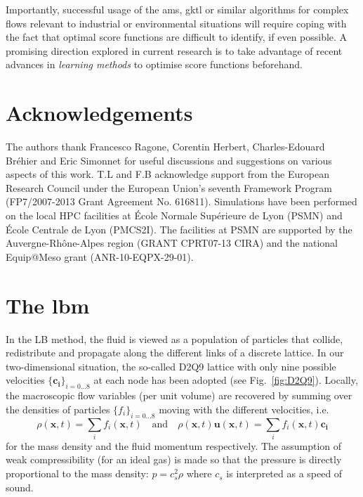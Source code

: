 \documentclass[pre,aps,floatfix,10pt,superscriptaddress, notitlepage,preprint]{revtex4-1}
\begin{document}
Importantly, successful usage of the \ac{ams}, \ac{gktl} or similar algorithms for complex flows relevant to industrial or environmental situations will require coping with the fact that optimal score functions
are difficult to identify, if even possible.
A promising direction explored in current research is to take advantage of recent advances in \emph{learning methods} to optimise score functions beforehand.

\section{Acknowledgements}
The authors thank Francesco Ragone, Corentin Herbert, Charles-Edouard Bréhier and Eric Simonnet for useful discussions and suggestions on various aspects of this work.
T.L and F.B acknowledge support from the European Research Council under the European Union's seventh Framework Program (FP7/2007-2013 Grant Agreement No. 616811).
Simulations have been performed on the local HPC facilities at École Normale Supérieure de Lyon (PSMN) and École Centrale de Lyon (PMCS2I).
The facilities at PSMN are supported by the Auvergne-Rhône-Alpes region (GRANT CPRT07-13 CIRA) and the national Equip@Meso grant (ANR-10-EQPX-29-01).

\appendix*
\section{The \acl{lbm}}
\label{sec:lbm}

In the LB method, the fluid is viewed as a population of particles that collide, redistribute and propagate along the different links of a discrete lattice. 
In our two-dimensional situation, the so-called D2Q9 lattice with only nine possible velocities $\{\mathbf{c_i}\}_{i=0...8}$ at each node has been adopted (see  Fig.~\ref{fig:D2Q9}).
Locally, the macroscopic flow variables (per unit volume) are recovered by summing over the densities of particles $\{f_i\}_{i=0...8}$ moving with the different velocities, i.e.
\[
\rho(\mathbf{x},t) = \sum_i f_i(\mathbf{x},t) \quad \mathrm{and}\quad \rho(\mathbf{x},t) \mathbf u(\mathbf{x},t) = \sum_i f_i(\mathbf{x},t) \mathbf{c_i}
\]
for the mass density and the fluid momentum respectively. The assumption of weak compressibility (for an ideal gas) is made so that the pressure is directly proportional to the mass density: $p = c_s^2 \rho$ where $c_s$ is interpreted as a speed of sound.  
\end{document}
